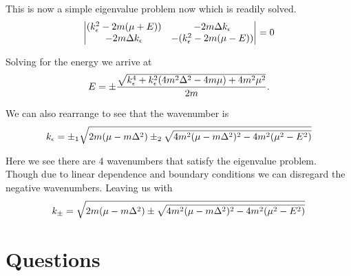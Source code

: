This is now a simple eigenvalue problem now which is readily solved. 
\begin{equation*}
  \begin{vmatrix}
    (k_{\epsilon}^2-2m(\mu+E)) & -2m\Delta k_{\epsilon} \\
    -2m\Delta k_{\epsilon} & -(k_{\epsilon}^2-2m(\mu-E)) 
  \end{vmatrix} 
  =
  0
\end{equation*}

Solving for the energy we arrive at 
\begin{equation}
  E = \pm\dfrac{\sqrt{k_{\epsilon}^4+k_{\epsilon}^2(4m^2\Delta^2-4m\mu)+4m^2\mu^2}}{2m}.
\end{equation}

We can also rearrange to see that the wavenumber is
\begin{equation}
  k_{\epsilon} = \pm_1 \sqrt{2m(\mu-m\Delta^2)\pm_2\sqrt{4m^2(\mu-m\Delta^2)^2 - 4m^2(\mu^2-E^2)}}
\end{equation}

Here we see there are 4 wavenumbers that satisfy the eigenvalue problem. 
Though due to linear dependence and boundary conditions we can disregard the negative wavenumbers. 
Leaving us with
\begin{equation}
  k_{\pm} = \sqrt{2m(\mu-m\Delta^2)\pm\sqrt{4m^2(\mu-m\Delta^2)^2 - 4m^2(\mu^2-E^2)}}
\end{equation}

\section{Questions}


